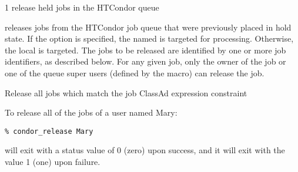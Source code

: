 \begin{ManPage}{\label{man-condor-release}}{1}
{release held jobs in the HTCondor queue}

\Synopsis {}
\ToolArgsBase 

\ToolDebugOption
\ToolLocate
\ToolJobs
\Bar{}  \Dots

\ToolDebugOption
\ToolLocate
\ToolAll

\Description

 releases jobs from the HTCondor job queue that were 
previously placed in hold state.  
If the  option is specified, the named  is targeted
for processing.  
Otherwise, the local  is targeted.
The jobs to be released are identified by one or more job identifiers, as
described below.
For any given job, only the owner of the job or one of the queue super users
(defined by the  macro) can release the job.

\begin{Options}
	\ToolArgsBaseDesc
	\ToolLocateDesc
	\ToolDebugDesc
	 {Release all jobs which match
	                the job ClassAd expression constraint}
\end{Options}

\SeeAlso
{}


\Examples
To release all of the jobs of a user named Mary:
\footnotesize
\begin{verbatim}
% condor_release Mary 
\end{verbatim}
\normalsize

\ExitStatus

 will exit with a status value of 0 (zero) upon success,
and it will exit with the value 1 (one) upon failure.

\end{ManPage}
